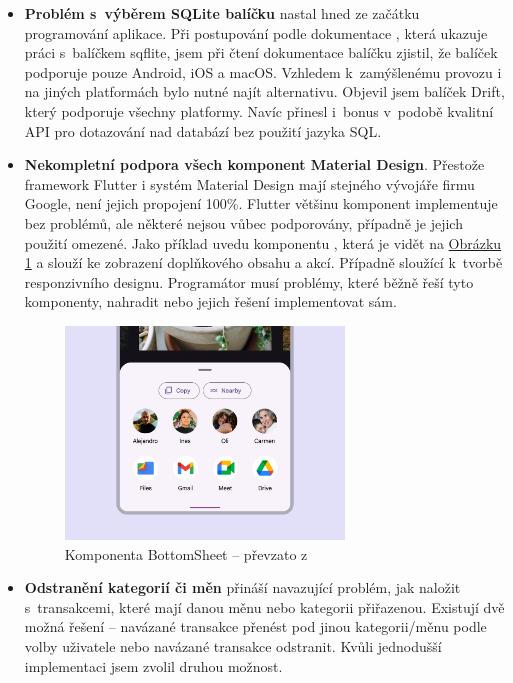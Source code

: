 \documentclass[
  biblatex,
  figures=true,
  tables=false,
  glossaries,
  index
]{kidiplom}
\begin{document}
\begin{itemize}
  \item \textbf{Problém s~výběrem SQLite balíčku} nastal hned ze začátku programování aplikace. Při postupování podle dokumentace \cite{flutter-docs}, která ukazuje práci s~balíčkem sqflite, jsem při čtení dokumentace balíčku zjistil, že balíček podporuje pouze Android, iOS a macOS. Vzhledem k~zamýšlenému provozu i na jiných platformách bylo nutné najít alternativu. Objevil jsem balíček Drift, který podporuje všechny platformy. Navíc přinesl i~bonus v~podobě kvalitní API pro dotazování nad databází bez použití jazyka SQL.
  \item \textbf{Nekompletní podpora všech komponent Material Design}. Přestože framework Flutter i systém Material Design mají stejného vývojáře firmu Google, není jejich propojení 100\%. Flutter většinu komponent implementuje bez problémů, ale některé nejsou vůbec podporovány, případně je jejich použití omezené. Jako příklad uvedu komponentu , která je vidět na \hyperref[fig:bottomsheet]{Obrázku \ref{fig:bottomsheet}} a slouží ke zobrazení doplňkového obsahu a akcí. Případně  sloužící k~tvorbě responzivního designu. Programátor musí problémy, které běžně řeší tyto komponenty, nahradit nebo jejich řešení implementovat sám.
  \begin{figure}
    \centering
    \includegraphics[width=0.7\textwidth]{images/bottom-sheet.png}
    \caption{Komponenta BottomSheet -- převzato z~\cite{m3}}
    \label{fig:bottomsheet}
  \end{figure}
  \item \textbf{Odstranění kategorií či měn} přináší navazující problém, jak naložit s~transakcemi, které mají danou měnu nebo kategorii přiřazenou. Existují dvě možná řešení -- navázané transakce přenést pod jinou kategorii/měnu podle volby uživatele nebo navázané transakce odstranit. Kvůli jednodušší implementaci jsem zvolil druhou možnost.
\end{itemize}
\end{document}
